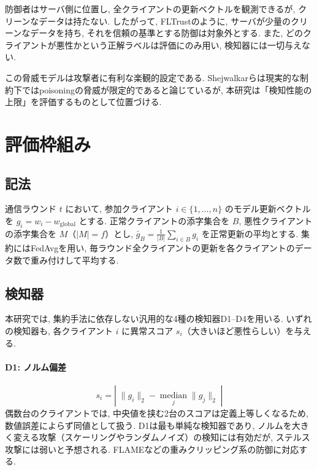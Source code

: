 \documentclass[a4j, dvipdfmx]{jsarticle}
\begin{document}
防御者はサーバ側に位置し, 全クライアントの更新ベクトルを観測できるが, クリーンなデータは持たない. したがって, FLTrust\cite{cao2021fltrust}のように, サーバが少量のクリーンなデータを持ち, それを信頼の基準とする防御は対象外とする. また, どのクライアントが悪性かという正解ラベルは評価にのみ用い, 検知器には一切与えない.

この脅威モデルは攻撃者に有利な楽観的設定である. Shejwalkarら\cite{shejwalkar2022back}は現実的な制約下ではpoisoningの脅威が限定的であると論じているが, 本研究は「検知性能の上限」を評価するものとして位置づける.

\section{評価枠組み}
\label{sec:framework}

\subsection{記法}

通信ラウンド $t$ において, 参加クライアント $i \in \{1,\dots,n\}$ のモデル更新ベクトルを $g_i = w_i - w_{\text{global}}$ とする. 正常クライアントの添字集合を $B$, 悪性クライアントの添字集合を $M$（$|M| = f$）とし, $\bar{g}_B = \frac{1}{|B|}\sum_{i \in B} g_i$ を正常更新の平均とする. 集約にはFedAvg\cite{mcmahan2017fedavg}を用い, 毎ラウンド全クライアントの更新を各クライアントのデータ数で重み付けして平均する.

\subsection{検知器}
\label{sec:detectors}

本研究では, 集約手法に依存しない汎用的な4種の検知器D1--D4を用いる. いずれの検知器も, 各クライアント $i$ に異常スコア $s_i$（大きいほど悪性らしい）を与える.

\paragraph{D1: ノルム偏差}
\begin{equation}
s_i = \left|\; \|g_i\|_2 - \operatorname*{median}_{j}\|g_j\|_2 \;\right|
\end{equation}
偶数台のクライアントでは, 中央値を挟む2台のスコアは定義上等しくなるため, 数値誤差によらず同値として扱う. D1は最も単純な検知器であり, ノルムを大きく変える攻撃（スケーリングやランダムノイズ）の検知には有効だが, ステルス攻撃には弱いと予想される. FLAME\cite{nguyen2022flame}などの重みクリッピング系の防御に対応する.
\end{document}
